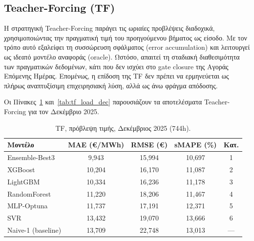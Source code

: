 \subsection{Teacher-Forcing (TF)}
\label{subsec:tf_static_dec}

Η στρατηγική Teacher-Forcing παράγει τις ωριαίες προβλέψεις διαδοχικά,
χρησιμοποιώντας την πραγματική τιμή του προηγούμενου βήματος ως είσοδο. Με τον
τρόπο αυτό εξαλείφει τη συσσώρευση σφάλματος (error accumulation) και λειτουργεί ως
ιδεατό μοντέλο αναφοράς (oracle). Ωστόσο, απαιτεί τη σταδιακή διαθεσιμότητα των
πραγματικών δεδομένων, κάτι που δεν ισχύει στο gate closure της Αγοράς Επόμενης
Ημέρας. Επομένως, η επίδοση της TF δεν πρέπει να ερμηνεύεται ως πλήρως αναπτυξίσιμη
επιχειρησιακή λύση, αλλά ως άνω φράγμα απόδοσης.

Οι Πίνακες~\ref{tab:tf_price_dec} και~\ref{tab:tf_load_dec} παρουσιάζουν τα
αποτελέσματα Teacher-Forcing για τον Δεκέμβριο 2025.

\begin{table}[H]
  \centering
  \caption{TF, πρόβλεψη τιμής, Δεκέμβριος 2025 (744h).}
  \label{tab:tf_price_dec}
  \begin{tabular}{lcccc}
    \toprule
    \textbf{Μοντέλο} & \textbf{MAE (€/MWh)} & \textbf{RMSE (€)} & \textbf{sMAPE (\%)} & \textbf{Κατ.} \\
    \midrule
    Ensemble-Best3        & 9,943  & 15,994 & 10,697 & 1 \\
    XGBoost               & 10,204 & 16,170 & 11,087 & 2 \\
    LightGBM              & 10,334 & 16,236 & 11,178 & 3 \\
    RandomForest          & 11,220 & 18,206 & 11,467 & 4 \\
    MLP-Optuna            & 11,737 & 17,191 & 12,371 & 5 \\
    SVR                   & 13,432 & 19,070 & 13,666 & 6 \\
    \midrule
    Naive-1 (baseline)    & 13,709 & 22,748 & 13,013 & --- \\
    \bottomrule
  \end{tabular}
\end{table}

